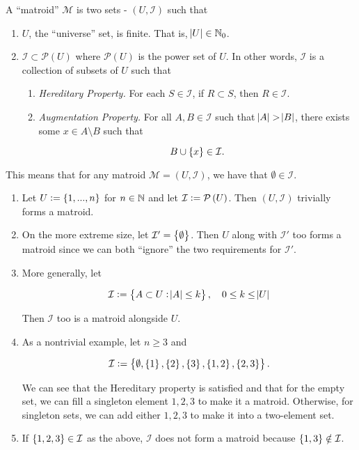 \begin{define}
    A ``matroid'' $\mathcal{M}$ is two sets - $(U, \mathcal{I})$ such that 

    \begin{enumerate}
        \item $U$, the ``universe'' set, is finite. That is, $\abs{U} \in \mathbb{N}_0$. 
        \item $\mathcal{I} \subset \mathcal{P}(U)$ where $\mathcal{P}(U)$ is the power set of $U$. 
        In other words, $\mathcal{I}$ is a collection of subsets of $U$ such that 
        \begin{enumerate}
            \item \textit{Hereditary Property.} For each $S \in \mathcal{I}$, if $R \subset S$, then $R \in \mathcal{I}$.
            \item \textit{Augmentation Property.} For all $A, B \in \mathcal{I}$ such that $\abs{A} > \abs{B}$, there exists some $x \in A \setminus B$ such that 

            \[
                B \cup \cbr{x} \in \mathcal{I}. 
            \]
        \end{enumerate}
    \end{enumerate}
\end{define}

\begin{remark}
    This means that for any matroid $\mathcal{M}=(U,\mathcal{I})$, we have that $\emptyset \in \mathcal{I}$. 
\end{remark}

\begin{example}
\begin{enumerate}
    \item Let $U \defeq \cbr{1, ..., n}$ for $n \in \mathbb{N}$ and let $\mathcal{I} \defeq \powerset\del{U}$. Then $(U, \mathcal{I})$ trivially forms a matroid.
    \item On the more extreme size, let $\mathcal{I}' = \cbr{\emptyset}$. Then $U$ along with $\mathcal{I}'$ too forms a matroid since we can both ``ignore'' the two requirements for $\mathcal{I}'$. 
    \item More generally, let

    \[
        \mathcal{I} \defeq \cbr{A \subset U : \abs{A} \le k}, \quad 0 \le k \le \abs{U}
    \]

    Then $\mathcal{I}$ too is a matroid alongside $U$. 

    \item As a nontrivial example, let $n \ge 3$ and 

    \[
        \mathcal{I} \defeq \cbr{\emptyset, \cbr{1}, \cbr{2}, \cbr{3}, \cbr{1,2}, \cbr{2,3}}.
    \]

    We can see that the Hereditary property is satisfied and that for the empty set, we can fill a singleton element $1, 2, 3$ to make it a matroid. 
    Otherwise, for singleton sets, we can add either $1,2, 3$ to make it into a two-element set. 
    \item If $\cbr{1, 2, 3} \in \mathcal{I}$ as the above, $\mathcal{I}$ does not form a matroid because $\cbr{1, 3} \notin \mathcal{I}$. 
\end{enumerate}
\end{example}

